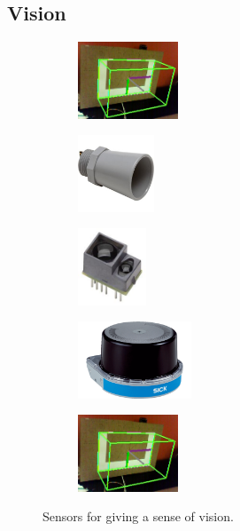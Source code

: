 \subsection{Vision}

\begin{figure}[H]
\begin{subfigure}[b]{.19\linewidth}
\includegraphics[height=0.9in]{imgs/sensor_cv.png}  %
\end{subfigure}\begin{subfigure}[b]{.19\linewidth}
\includegraphics[height=0.9in]{imgs/sensor_ultrasonic.jpeg}
\end{subfigure}\begin{subfigure}[b]{.19\linewidth}
\includegraphics[height=0.9in]{imgs/sensor_tof.jpeg}
\end{subfigure}\begin{subfigure}[b]{.19\linewidth}
\includegraphics[height=0.9in]{imgs/sensor_lidar.png}
\end{subfigure}\begin{subfigure}[b]{.19\linewidth}
\includegraphics[height=0.9in]{imgs/sensor_cv.png}
\end{subfigure}
\caption{Sensors for giving a sense of vision.}
\end{figure}

